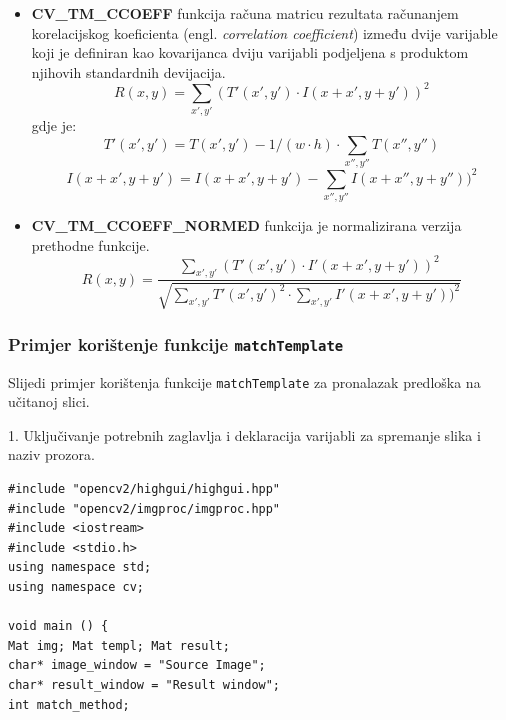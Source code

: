 \begin{itemize}
    \item \textbf{CV\_TM\_CCOEFF} funkcija računa matricu 
    rezultata računanjem korelacijskog koeficienta (engl.
    \textit{correlation coefficient}) između dvije varijable 
    koji je definiran kao kovarijanca dviju varijabli podjeljena
    s produktom njihovih standardnih devijacija.
    \begin{equation}
      R\left ( x,y \right )= \sum_{{x}',{y}'} ({T}'({x}',{y}')\cdot I\left ( x+{x}',y+{y}' \right ))^{2}
    \end{equation}
     gdje je:
    \begin{equation}
     {T}'({x}',{y}')=T({x}',{y}')-1/(w\cdot h)\cdot \sum_{{x}'',{y}''}T({x}'',{y}'')
    \end{equation}
    \begin{equation}
      I\left ( x+{x}',y+{y}' \right )=I\left ( x+{x}',y+{y}' \right )- \sum_{{x}'',{y}''}I\left ( x+{x}'',y+{y}'' \right ))^{2}
    \end{equation}
      
    \item \textbf{CV\_TM\_CCOEFF\_NORMED} funkcija je
     normalizirana verzija prethodne funkcije.
    \begin{equation}
      R\left ( x,y \right )= \frac{ \sum_{{x}',{y}'}({T}'({x}',{y}')\cdot {I}'\left ( x+{x}',y+{y}' \right ))^{2}}{\sqrt{\sum_{{x}',{y}'}{T}'({x}',{y}')^{2}\cdot \sum_{{x}',{y}'}{I}'\left ( x+{x}',y+{y}' \right ))^{2}}}
    \end{equation}
\end{itemize}


\newpage
\subsubsection{Primjer korištenje funkcije \texttt{matchTemplate} } %
\label{ssub:Primjer korištenje funkcije }

Slijedi primjer korištenja funkcije \texttt{matchTemplate} za pronalazak
predloška na učitanoj slici.

1. Uključivanje potrebnih zaglavlja i deklaracija varijabli za spremanje
slika i naziv prozora.
\begin{lstlisting}[label=lst1,caption={}]
#include "opencv2/highgui/highgui.hpp"
#include "opencv2/imgproc/imgproc.hpp"
#include <iostream>
#include <stdio.h>
using namespace std;
using namespace cv;

void main () {
Mat img; Mat templ; Mat result;
char* image_window = "Source Image";
char* result_window = "Result window";
int match_method;
\end{lstlisting}

